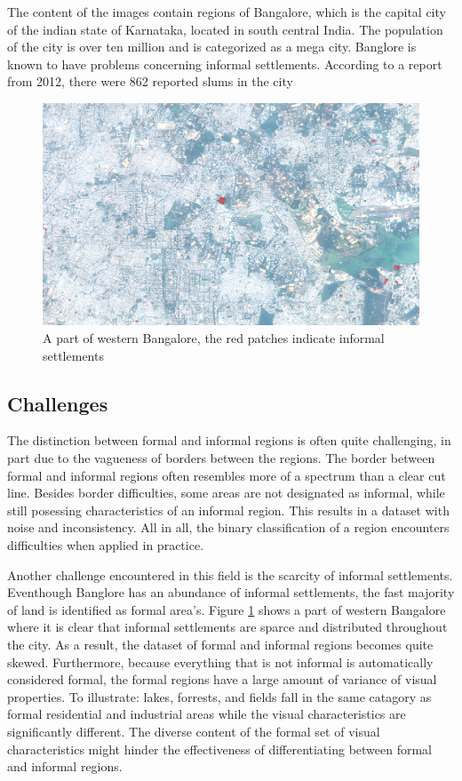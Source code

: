 The content of the images contain regions of Bangalore, which is the capital
city of the indian state of Karnataka, located in south central India. The
population of the city is over ten million and is categorized as a mega city.
Banglore is known to have problems concerning informal settlements. According
to a report from 2012, there were 862 reported slums in the city


\begin{figure}
  \includegraphics[width=\linewidth]{images/west-bangalore}
  \caption{A part of western Bangalore, the red patches indicate informal
  settlements}
  \label{fig:west-bangalore}
\end{figure}

\subsection{Challenges}

The distinction between formal and informal regions is often quite challenging,
in part due to the vagueness of borders between the regions. The border between
formal and informal regions often resembles more of a spectrum than a clear cut line.
Besides border difficulties, some areas are not designated as informal, while
still posessing characteristics of an informal region. This results in
a dataset with noise and inconsistency.  All in all, the binary classification
of a region encounters difficulties when applied in practice. 

Another challenge encountered in this field is the scarcity of informal
settlements.  Eventhough Banglore  has an abundance of informal settlements,
the fast majority of land is identified as formal area's. Figure
\ref{fig:west-bangalore} shows a part of western Bangalore where it is clear
that informal settlements are sparce and distributed throughout the city. As
a result, the dataset of formal and informal regions becomes quite skewed.
Furthermore, because everything that is not informal is automatically
considered formal, the formal regions have a large amount of variance of visual
properties.  To illustrate: lakes, forrests, and fields fall in the same
catagory as formal residential and industrial areas while the visual
characteristics are significantly different. The diverse content of the formal
set of visual characteristics might hinder the effectiveness of differentiating
between formal and informal regions. 

